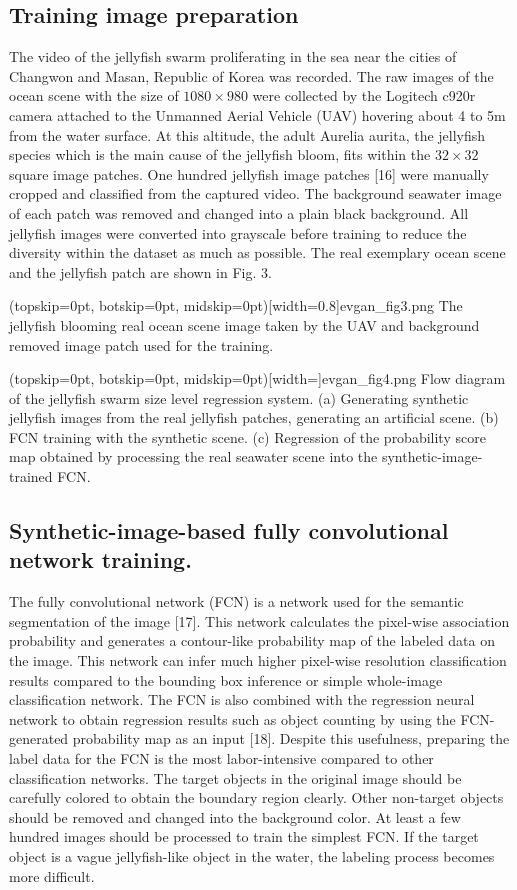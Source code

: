 \documentclass{ieeeaccess}
\begin{document}
\subsection{Training image preparation}
The video of the jellyfish swarm proliferating in the sea near the cities of Changwon and Masan, Republic of Korea was recorded. The raw images of the ocean scene with the size of $1080 \times 980$ were collected by the Logitech c920r camera attached to the Unmanned Aerial Vehicle (UAV) hovering about 4 to 5m from the water surface. At this altitude, the adult Aurelia aurita, the jellyfish species which is the main cause of the jellyfish bloom, fits within the $32 \times 32$ square image patches. One hundred jellyfish image patches [16] were manually cropped and classified from the captured video. The background seawater image of each patch was removed and changed into a plain black background. All jellyfish images were converted into grayscale before training to reduce the diversity within the dataset as much as possible. The real exemplary ocean scene and the jellyfish patch are shown in Fig. 3.

\Figure[t](topskip=0pt, botskip=0pt, midskip=0pt)[width=0.8\textwidth]{evgan_fig3.png}
{The jellyfish blooming real ocean scene image taken by the UAV and background removed image patch used for the training.\label{fig3}}

\Figure[!t](topskip=0pt, botskip=0pt, midskip=0pt)[width=\linewidth]{evgan_fig4.png}
{Flow diagram of the jellyfish swarm size level regression system. (a) Generating synthetic jellyfish images from the real jellyfish patches, generating an 
artificial scene. (b) FCN training with the synthetic scene. (c) Regression of the probability score map obtained by processing the real seawater scene into the synthetic-image-trained FCN.\label{fig4}}

\subsection{Synthetic-image-based fully convolutional network training.}
The fully convolutional network (FCN) is a network used for the semantic segmentation of the image [17]. This network calculates the pixel-wise association probability and generates a contour-like probability map of the labeled data on the image. This network can infer much higher pixel-wise resolution classification results compared to the bounding box inference or simple whole-image classification network. The FCN is also combined with the regression neural network to obtain regression results such as object counting by using the FCN-generated probability map as an input [18]. Despite this usefulness, preparing the label data for the FCN  is the most labor-intensive compared to other classification networks. The target objects in the original image should be carefully colored to obtain the boundary region clearly. Other non-target objects should be removed and changed into the background color. At least a few hundred images should be processed to train the simplest FCN. If the target object is a vague jellyfish-like object in the water, the labeling process becomes more difficult.
\end{document}
